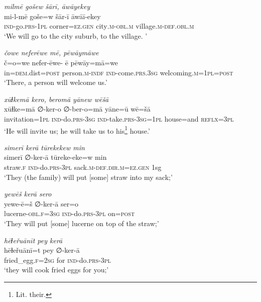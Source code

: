 \ea \label{HB.33}
\textit{milmē gošew šārī, āwāyekey} \\ 
\gll mi-l-mē goše=w šār-ī āwāī-ekey \\ 
 \textsc{ind-}go\textsc{.prs}\textsc{-1pl} corner\textsc{=ez}\textsc{.gen} city\textsc{.m}\textsc{-obl}\textsc{.m} village\textsc{.m}\textsc{-def}\textsc{.obl}\textsc{.m} \\ 
\glt `We will go to the city suburb, to the village. '
\z 
 
\ea \label{HB.34}
\textit{čowe neferēwe mē, pēwāymāwe} \\ 
\gll č=o=we nefer-ēwe- ē pēwāy=mā=we \\ 
 in\textsc{=dem}.dist\textsc{=\textsc{post}} person\textsc{.m}\textsc{-indf} \textsc{ind-}come\textsc{.prs}\textsc{.3sg} welcoming\textsc{.m}\textsc{=1pl}\textsc{=\textsc{post}} \\ 
\glt `There, a person will welcome us.'
\z 
 
\ea \label{HB.35}
\textit{xūɫkemā kero, beromā yānew wēšā} \\ 
\gll xūɫke=mā ∅-ker-o ∅-ber-o=mā yāne=ū wē=šā \\ 
 invitation\textsc{=1pl} \textsc{ind-}do\textsc{.prs}\textsc{-3sg} \textsc{ind-}take\textsc{.prs}\textsc{-3sg}\textsc{=1pl} house=and \textsc{reflx}\textsc{=3pl} \\ 
\glt `He will invite us; he will take us to his\footnote{Lit. their.} house.'
\z 
 
\ea \label{HB.36}
\textit{simerī kerā tūrekekew min} \\ 
\gll simerī ∅-ker-ā tūreke-eke=w min \\ 
 straw\textsc{\textsc{.f}} \textsc{ind-}do\textsc{.prs}\textsc{-3pl} sack\textsc{.m}\textsc{-def}\textsc{.dir}\textsc{.m}\textsc{=ez}\textsc{.gen} 1sg \\ 
\glt `They (the family) will put [some] straw into my sack;'
\z 
 
\ea \label{HB.37}
\textit{yewēš kerā sero} \\ 
\gll yewe-ē=š ∅-ker-ā ser=o \\ 
 lucerne\textsc{-obl}\textsc{\textsc{.f}}\textsc{=3sg} \textsc{ind-}do\textsc{.prs}\textsc{-3pl} on\textsc{=\textsc{post}} \\ 
\glt `They will put [some] lucerne on top of the straw;'
\z 
 
\ea \label{HB.39}
\textit{hēɫeřuānīt pey kerā} \\ 
\gll hēɫeřuānī=t pey ∅-ker-ā \\ 
 fried\_egg\textsc{\textsc{.f}}\textsc{=\textsc{2sg}} for \textsc{ind-}do\textsc{.prs}\textsc{-3pl} \\ 
\glt `they will cook fried eggs for you;'
\z 
 
